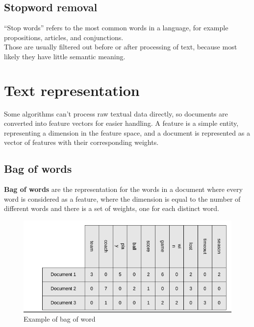 \subsection{Stopword removal}
“Stop words” refers to the most common words in a language, for
example propositions, articles, and conjunctions.\\
Those are usually filtered out before or after processing of text,
because most likely they have little semantic meaning.
\section{Text representation}
Some algorithms can't process raw textual data directly, so documents
are converted into feature vectors for easier handling. A feature is a
simple entity, representing a dimension in the feature space, and a
document is represented as a vector of features with their
corresponding weights.
\subsection{Bag of words}

\textbf{Bag of words} are the representation for the words in a
document where every word is considered as a feature, where the
dimension is equal to the number of different words and there is a set
of weights, one for each distinct word.

\begin{figure}[H]
    \centering
    \includegraphics[scale=0.6]{images/Data pre-process/Word-bag.png}
    \caption{Example of bag of word}
    \label{fig:enter-label}
\end{figure}

